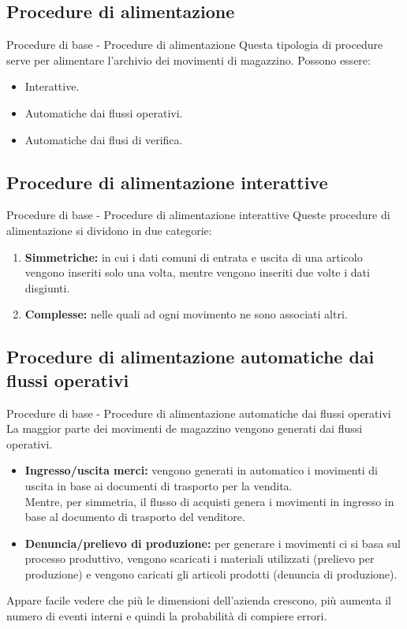 \documentclass{beamer}
\begin{document}
\subsection{Procedure di alimentazione}
\begin{frame}{Procedure di base - Procedure di alimentazione}
    Questa tipologia di procedure serve per alimentare l'archivio dei movimenti di magazzino.
    Possono essere:
    \begin{itemize}
        \item Interattive.
        \item Automatiche dai flussi operativi.
        \item Automatiche dai flusi di verifica.
    \end{itemize}
\end{frame}

\subsection{Procedure di alimentazione interattive}
\begin{frame}{Procedure di base - Procedure di alimentazione interattive}
    Queste procedure di alimentazione si dividono in due categorie:
    \begin{enumerate}
        \item \textbf{Simmetriche:} in cui i dati comuni di entrata e uscita di una articolo vengono inseriti solo una volta, mentre vengono inseriti due volte i dati disgiunti.
        \item \textbf{Complesse:} nelle quali ad ogni movimento ne sono associati altri.
    \end{enumerate}
\end{frame}

\subsection{Procedure di alimentazione automatiche dai flussi operativi}
\begin{frame}{Procedure di base - Procedure di alimentazione automatiche dai flussi operativi}
    La maggior parte dei movimenti de magazzino vengono generati dai flussi operativi.
    \begin{itemize}
        \item \textbf{Ingresso/uscita merci:} vengono generati in automatico i movimenti di uscita in base ai documenti di trasporto per la vendita.\\
            Mentre, per simmetria, il flusso di acquisti genera i movimenti in ingresso in base al documento di trasporto del venditore.
        \item \textbf{Denuncia/prelievo di produzione:} per generare i movimenti ci si basa sul processo produttivo, vengono scaricati i materiali utilizzati (prelievo per produzione) e vengono caricati gli articoli prodotti (denuncia di produzione).
    \end{itemize}
    Appare facile vedere che più le dimensioni dell'azienda crescono, più aumenta il numero di eventi interni e quindi la probabilità di compiere errori.
\end{frame}
\end{document}
